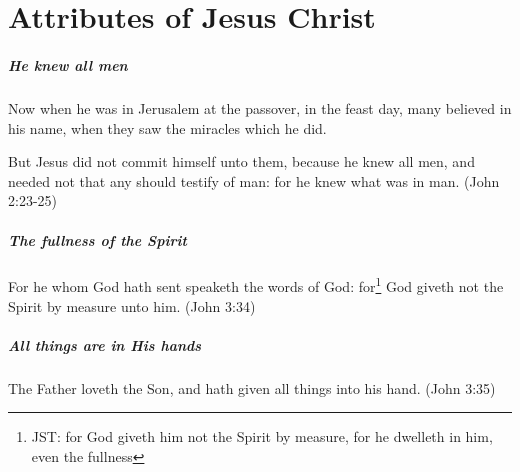 \chapter{Attributes of Jesus Christ}

\paragraph{He knew all men}
Now when he was in Jerusalem at the passover, in the feast day, many believed in his name, when they saw the miracles which he did.

But Jesus did not commit himself unto them, because he knew all men, and needed not that any should testify of man: for he knew what was in man. (John 2:23-25)


\paragraph{The fullness of the Spirit}
For he whom God hath sent speaketh the words of God: for\footnote{JST: for God giveth him not the Spirit by measure, for he dwelleth in him, even the fullness} God giveth not the Spirit by measure unto him. (John 3:34)

\paragraph{All things are in His hands}
The Father loveth the Son, and hath given all things into his hand. (John 3:35)
